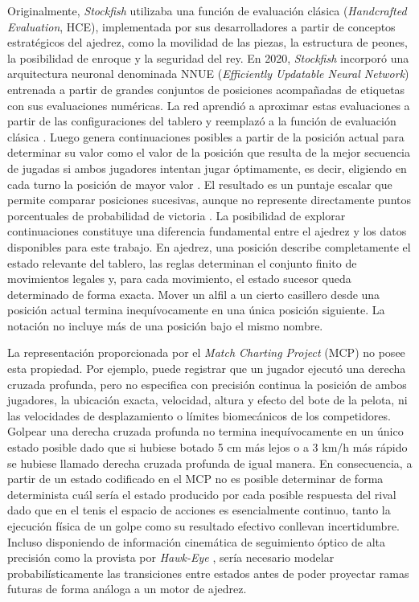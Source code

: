 \documentclass[journal]{IEEEtran}
\begin{document}
Originalmente, \textit{Stockfish} utilizaba una función de evaluación clásica (\textit{Handcrafted Evaluation}, HCE), implementada por sus desarrolladores a partir de conceptos estratégicos del ajedrez, como la movilidad de las piezas, la estructura de peones, la posibilidad de enroque y la seguridad del rey. En 2020, \textit{Stockfish} incorporó una arquitectura neuronal denominada NNUE (\textit{Efficiently Updatable Neural Network}) entrenada a partir de grandes conjuntos de posiciones acompañadas de etiquetas con sus evaluaciones numéricas. La red aprendió a aproximar estas evaluaciones a partir de las configuraciones del tablero y reemplazó a la función de evaluación clásica \cite{nasu2018nnue, Klein2022NeuralNF, stockfish_nnue}. Luego genera continuaciones posibles a partir de la posición actual para determinar su valor como el valor de la posición que resulta de la mejor secuencia de jugadas si ambos jugadores intentan jugar óptimamente, es decir, eligiendo en cada turno la posición de mayor valor \cite{knuth1975analysis}. El resultado es un puntaje escalar que permite comparar posiciones sucesivas, aunque no represente directamente puntos porcentuales de probabilidad de victoria \cite{stockfish_evaluation}. La posibilidad de explorar continuaciones constituye una diferencia fundamental entre el ajedrez y los datos disponibles para este trabajo. En ajedrez, una posición describe completamente el estado relevante del tablero, las reglas determinan el conjunto finito de movimientos legales y, para cada movimiento, el estado sucesor queda determinado de forma exacta. Mover un alfil a un cierto casillero desde una posición actual termina inequívocamente en una única posición siguiente. La notación no incluye más de una posición bajo el mismo nombre. 

La representación proporcionada por el \textit{Match Charting Project} (MCP) \cite{sackmann2026mcp} no posee esta propiedad. Por ejemplo, puede registrar que un jugador ejecutó una derecha cruzada profunda, pero no especifica con precisión continua la posición de ambos jugadores, la ubicación exacta, velocidad, altura y efecto del bote de la pelota, ni las velocidades de desplazamiento o límites biomecánicos de los competidores. Golpear una derecha cruzada profunda no termina inequívocamente en un único estado posible dado que si hubiese botado 5 cm más lejos o a 3 km/h más rápido se hubiese llamado derecha cruzada profunda de igual manera. En consecuencia, a partir de un estado codificado en el MCP no es posible determinar de forma determinista cuál sería el estado producido por cada posible respuesta del rival dado que en el tenis el espacio de acciones es esencialmente continuo, tanto la ejecución física de un golpe como su resultado efectivo conllevan incertidumbre. Incluso disponiendo de información cinemática de seguimiento óptico de alta precisión como la provista por \textit{Hawk-Eye} \cite{vanMeurs2021PositionalAdvantage}, sería necesario modelar probabilísticamente las transiciones entre estados antes de poder proyectar ramas futuras de forma análoga a un motor de ajedrez.
\end{document}
